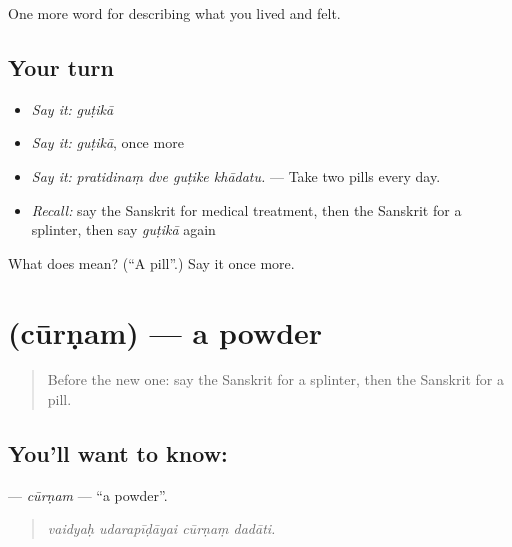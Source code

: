 \begin{grammarlens}[title={What you've built}]
One more word for describing what you lived and felt.
\end{grammarlens}

\subsection*{Your turn}
\begin{itemize}
\raggedright
  \item \emph{Say it:} \emph{guṭikā}
  \item \emph{Say it:} \emph{guṭikā}, once more
  \item \emph{Say it:} \emph{pratidinaṃ dve guṭike khādatu.} — Take two pills every day.
  \item \emph{Recall:} say the Sanskrit for medical treatment, then the Sanskrit for a splinter, then say \emph{guṭikā} again
\end{itemize}

\begin{tcolorbox}[breakable,colback=teal!4,colframe=teal!35!black,title={Before you move on}]
What does  mean? (\textquotedblleft{}A pill\textquotedblright{}.) Say it once more.
\end{tcolorbox}
\section[\texorpdfstring{\sk{चूर्णम्} (cūrṇam)}{चूर्णम् (cūrṇam)}]{ (cūrṇam) — a powder}

\label{lesson:SA-C483-curnam}



\begin{quote}
Before the new one: say the Sanskrit for a splinter, then the Sanskrit for a pill.
\end{quote}

\subsection*{You'll want to know: }
\textbf{} — \emph{cūrṇam} — \textquotedblleft{}a powder\textquotedblright{}.

\begin{quote}
   
\end{quote}

\begin{quote}
\emph{vaidyaḥ udarapīḍāyai cūrṇaṃ dadāti.}
\end{quote}

